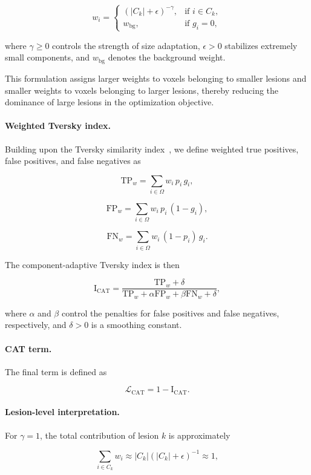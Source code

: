 \[
w_i =
\begin{cases}
(|C_k| + \epsilon)^{-\gamma}, & \text{if } i \in C_k, \\
w_{\mathrm{bg}}, & \text{if } g_i = 0 ,
\end{cases}
\]

where $\gamma \ge 0$ controls the strength of size adaptation,
$\epsilon > 0$ stabilizes extremely small components,
and $w_{\mathrm{bg}}$ denotes the background weight.

This formulation assigns larger weights to voxels belonging to smaller
lesions and smaller weights to voxels belonging to larger lesions,
thereby reducing the dominance of large lesions in the optimization
objective.

\paragraph{Weighted Tversky index.}
Building upon the Tversky similarity index~\cite{salehi_tversky_2017},
we define weighted true positives, false positives, and false negatives as

\[
\mathrm{TP}_w = \sum_{i \in \Omega} w_i \, p_i \, g_i,
\]

\[
\mathrm{FP}_w = \sum_{i \in \Omega} w_i \, p_i \, (1 - g_i),
\]

\[
\mathrm{FN}_w = \sum_{i \in \Omega} w_i \, (1 - p_i) \, g_i.
\]

The component-adaptive Tversky index is then

\[
\mathrm{I}_{\mathrm{CAT}} =
\frac{\mathrm{TP}_w + \delta}
{\mathrm{TP}_w + \alpha \mathrm{FP}_w + \beta \mathrm{FN}_w + \delta},
\]

where $\alpha$ and $\beta$ control the penalties for false positives and
false negatives, respectively, and $\delta > 0$ is a smoothing constant.

\paragraph{CAT term.}
The final term is defined as

\[
\mathcal{L}_{\mathrm{CAT}} = 1 - \mathrm{I}_{\mathrm{CAT}} .
\]

\paragraph{Lesion-level interpretation.}
For $\gamma = 1$, the total contribution of lesion $k$ is approximately

\[
\sum_{i \in C_k} w_i
\approx
|C_k| (|C_k| + \epsilon)^{-1}
\approx 1,
\]

